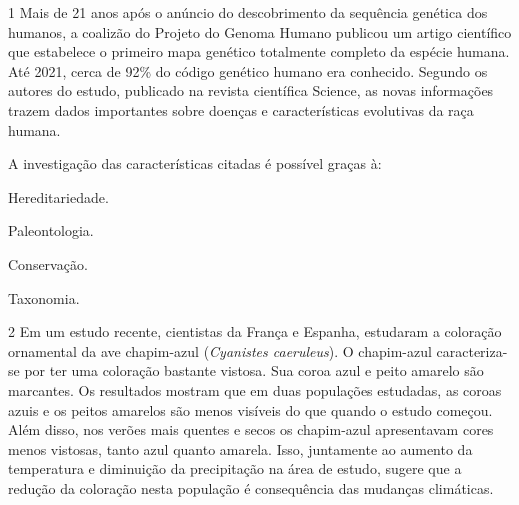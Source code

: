 

\num{1}  Mais de 21 anos após o anúncio do descobrimento da sequência genética
  dos humanos, a coalizão do Projeto do Genoma Humano publicou um artigo
  científico que estabelece o primeiro mapa genético totalmente completo
  da espécie humana. Até 2021, cerca de 92\% do código genético humano
  era conhecido. Segundo os autores do estudo, publicado na revista
  científica Science, as novas informações trazem dados importantes
  sobre doenças e características evolutivas da raça humana.


A investigação das características citadas é possível graças à:

\begin{escolha}
\item
  Hereditariedade.
\item
  Paleontologia.
\item
  Conservação.
\item
  Taxonomia.
\end{escolha}


\num{2}  Em um estudo recente, cientistas da França e Espanha, estudaram a
  coloração ornamental da ave chapim-azul (\emph{Cyanistes caeruleus}).
  O chapim-azul caracteriza-se por ter uma coloração bastante vistosa.
  Sua coroa azul e peito amarelo são marcantes. Os resultados mostram
  que em duas populações estudadas, as coroas azuis e os peitos amarelos
  são menos visíveis do que quando o estudo começou. Além disso, nos
  verões mais quentes e secos os chapim-azul apresentavam cores menos
  vistosas, tanto azul quanto amarela. Isso, juntamente ao aumento da
  temperatura e diminuição da precipitação na área de estudo, sugere que
  a redução da coloração nesta população é consequência das mudanças
  climáticas.

